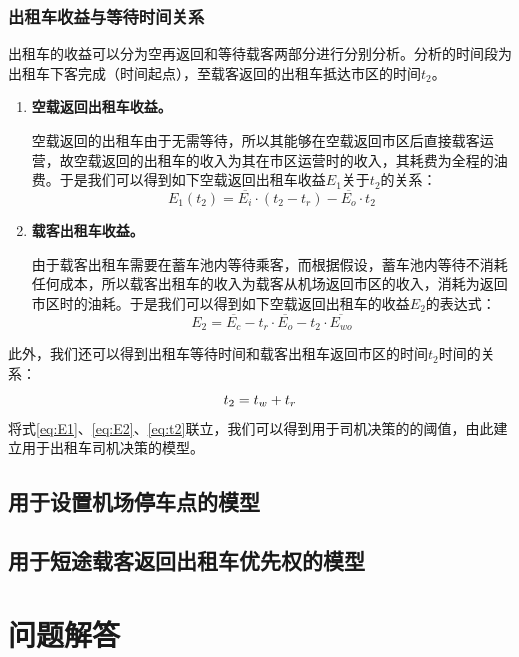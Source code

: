 \documentclass{cumcm}
\begin{document}
\subsubsection{出租车收益与等待时间关系}
出租车的收益可以分为空再返回和等待载客两部分进行分别分析。分析的时间段为出租车下客完成（时间起点），至载客返回的出租车抵达市区的时间$t_2$。
\begin{enumerate}[(1)]
	\item \textbf{空载返回出租车收益。}\par
	空载返回的出租车由于无需等待，所以其能够在空载返回市区后直接载客运营，故空载返回的出租车的收入为其在市区运营时的收入，其耗费为全程的油费。于是我们可以得到如下空载返回出租车收益$E_1$关于$t_2$的关系：
	\begin{equation}
		E_1(t_2)=\overline{E_i}\cdot(t_2-t_r)-\overline{E_o}\cdot t_2
		\label{eq:E1}
	\end{equation}
	\item \textbf{载客出租车收益。}\par
	由于载客出租车需要在蓄车池内等待乘客，而根据假设，蓄车池内等待不消耗任何成本，所以载客出租车的收入为载客从机场返回市区的收入，消耗为返回市区时的油耗。于是我们可以得到如下空载返回出租车的收益$E_2$的表达式：
	\begin{equation}
		E_2=\overline{E_c}-t_r\cdot\overline{E_o}-t_2\cdot\overline{E_{wo}}
		\label{eq:E2}
	\end{equation}
\end{enumerate}
\par
此外，我们还可以得到出租车等待时间\waittime 和载客出租车返回市区的时间$t_2$时间的关系：
\begin{equation}
	t_2=\mbox{$t_w$}+t_r
	\label{eq:t2}
\end{equation}
将式\ref{eq:E1}、\ref{eq:E2}、\ref{eq:t2}联立，我们可以得到用于司机决策的\waittime 的阈值，由此建立用于出租车司机决策的模型。
\subsection{用于设置机场停车点的模型}

\subsection{用于短途载客返回出租车优先权的模型}

\section{问题解答}
\end{document}
